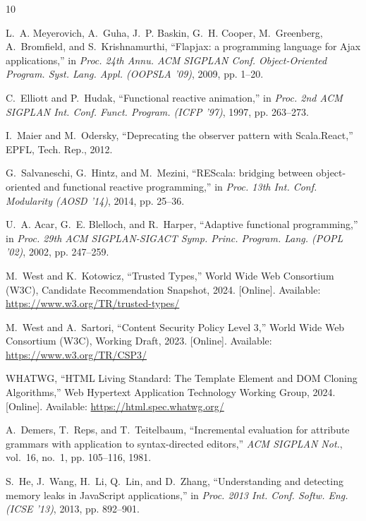 \documentclass[10pt,journal,compsoc]{IEEEtran}
\begin{document}
\begin{thebibliography}{10}

L.~A. Meyerovich, A.~Guha, J.~P. Baskin, G.~H. Cooper, M.~Greenberg, A.~Bromfield, and S.~Krishnamurthi, ``Flapjax: a programming language for Ajax applications,'' in \emph{Proc. 24th Annu. ACM SIGPLAN Conf. Object-Oriented Program. Syst. Lang. Appl. (OOPSLA '09)}, 2009, pp. 1--20.

C.~Elliott and P.~Hudak, ``Functional reactive animation,'' in \emph{Proc. 2nd ACM SIGPLAN Int. Conf. Funct. Program. (ICFP '97)}, 1997, pp. 263--273.

I.~Maier and M.~Odersky, ``Deprecating the observer pattern with Scala.React,'' EPFL, Tech. Rep., 2012.

G.~Salvaneschi, G.~Hintz, and M.~Mezini, ``REScala: bridging between object-oriented and functional reactive programming,'' in \emph{Proc. 13th Int. Conf. Modularity (AOSD '14)}, 2014, pp. 25--36.

U.~A. Acar, G.~E. Blelloch, and R.~Harper, ``Adaptive functional programming,'' in \emph{Proc. 29th ACM SIGPLAN-SIGACT Symp. Princ. Program. Lang. (POPL '02)}, 2002, pp. 247--259.

M.~West and K.~Kotowicz, ``Trusted Types,'' World Wide Web Consortium (W3C), Candidate Recommendation Snapshot, 2024. [Online]. Available: \url{https://www.w3.org/TR/trusted-types/}

M.~West and A.~Sartori, ``Content Security Policy Level 3,'' World Wide Web Consortium (W3C), Working Draft, 2023. [Online]. Available: \url{https://www.w3.org/TR/CSP3/}

{WHATWG}, ``HTML Living Standard: The Template Element and DOM Cloning Algorithms,'' Web Hypertext Application Technology Working Group, 2024. [Online]. Available: \url{https://html.spec.whatwg.org/}

A.~Demers, T.~Reps, and T.~Teitelbaum, ``Incremental evaluation for attribute grammars with application to syntax-directed editors,'' \emph{ACM SIGPLAN Not.}, vol.~16, no.~1, pp. 105--116, 1981.

S.~He, J.~Wang, H.~Li, Q.~Lin, and D.~Zhang, ``Understanding and detecting memory leaks in JavaScript applications,'' in \emph{Proc. 2013 Int. Conf. Softw. Eng. (ICSE '13)}, 2013, pp. 892--901.

\end{thebibliography}
\end{document}
